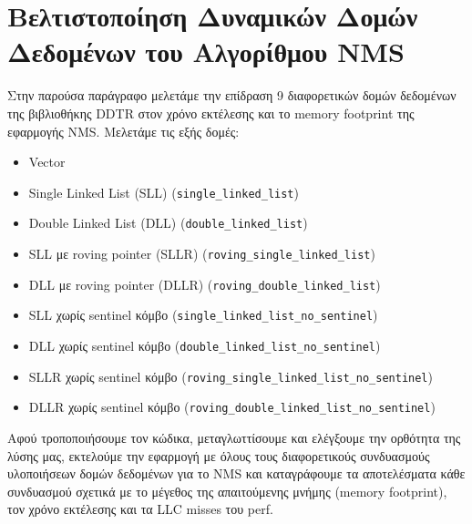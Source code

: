 \documentclass[12pt]{article}
\begin{document}
\section{Βελτιστοποίηση Δυναμικών Δομών Δεδομένων του Αλγορίθμου NMS}
Στην παρούσα παράγραφο μελετάμε την επίδραση 9 διαφορετικών δομών δεδομένων της βιβλιοθήκης DDTR στον χρόνο εκτέλεσης και το memory footprint της εφαρμογής NMS. Μελετάμε τις εξής δομές:
\begin{itemize}
\item Vector
\item Single Linked List (SLL) (\texttt{single\_linked\_list})
\item Double Linked List (DLL) (\texttt{double\_linked\_list})
\item SLL με roving pointer (SLLR) (\texttt{roving\_single\_linked\_list})
\item DLL με roving pointer (DLLR) (\texttt{roving\_double\_linked\_list})
\item SLL χωρίς sentinel κόμβο (\texttt{single\_linked\_list\_no\_sentinel})
\item DLL χωρίς sentinel κόμβο (\texttt{double\_linked\_list\_no\_sentinel})
\item SLLR χωρίς sentinel κόμβο (\texttt{roving\_single\_linked\_list\_no\_sentinel})
\item DLLR χωρίς sentinel κόμβο (\texttt{roving\_double\_linked\_list\_no\_sentinel})
\end{itemize}

Αφού τροποποιήσουμε τον κώδικα, μεταγλωττίσουμε και ελέγξουμε την ορθότητα της λύσης μας, εκτελούμε την εφαρμογή με όλους τους διαφορετικούς συνδυασμούς υλοποιήσεων δομών δεδομένων για το NMS και καταγράφουμε τα αποτελέσματα κάθε συνδυασμού σχετικά με το μέγεθος της απαιτούμενης μνήμης (memory footprint), τον χρόνο εκτέλεσης και τα LLC misses του perf.

\begin{table}[H]
    \centering
    \caption{Μετρήσεις Απόδοσης, Μνήμης και LLC Misses για τις 9 Δομές Δεδομένων και την Αρχική Υλοποίηση ($3\times20 = 60$ runs)}
    \label{tab:q2-ddts}
\end{table}
\end{document}
